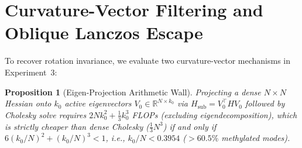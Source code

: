 \documentclass[10pt,twocolumn,letterpaper]{article}
\newtheorem{proposition}[theorem]{Proposition}
\begin{document}
\section{Curvature-Vector Filtering and Oblique Lanczos Escape}
To recover rotation invariance, we evaluate two curvature-vector mechanisms in Experiment~3:

\begin{proposition}[Eigen-Projection Arithmetic Wall]
Projecting a dense $N \times N$ Hessian onto $k_0$ active eigenvectors $V_0 \in \mathbb{R}^{N \times k_0}$ via $H_{\text{sub}} = V_0^\top H V_0$ followed by Cholesky solve requires $2Nk_0^2 + \frac{1}{3}k_0^3$ FLOPs (excluding eigendecomposition), which is strictly cheaper than dense Cholesky ($\frac{1}{3}N^3$) if and only if $6(k_0/N)^2 + (k_0/N)^3 < 1$, i.e., $k_0/N < 0.3954$ ($>60.5\%$ methylated modes).
\end{proposition}

\begin{table}[!htbp]
\caption{Rotated curvature scaling and oblique $SO(19)$ polymer saddle escape ($n=24$ seeds).}
\label{tab:exp3}
\vspace{2pt}
\end{table}
\end{document}
